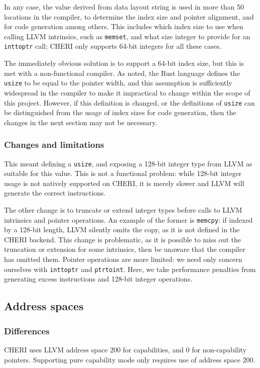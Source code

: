 \documentclass[dissertation.tex]{subfiles}
\begin{document}
In any case, the value derived from data layout string is used in more
than 50 locations in the compiler, to determine the index size and
pointer alignment, and for code generation among others.
This includes which index size to use when calling LLVM intrinsics, such
as \texttt{memset}, and what size integer to provide for an
\texttt{inttoptr} call; CHERI only supports 64-bit integers for all
these cases.

The immediately obvious solution is to support a 64-bit index size, but
this is met with a non-functional compiler.
As  noted, the Rust language defines the
\texttt{usize} to be equal to the pointer width, and this assumption is
sufficiently widespread in the compiler to make it impractical to change
within the scope of this project.
However, if this definition is changed, or the definitions of
\texttt{usize} can be distinguished from the usage of index sizes for
code generation, then the changes in the next section may not be
necessary.


\subsubsection{Changes and limitations}
This meant defining a \texttt{usize}, and exposing a 128-bit integer
type from LLVM as suitable for this value.
This is not a functional problem: while 128-bit integer usage is not
natively supported on CHERI, it is merely slower and LLVM will generate
the correct instructions.

The other change is to truncate or extend integer types before calls to
LLVM intrinsics and pointer operations.
An example of the former is \texttt{memcpy}: if indexed by a 128-bit
length, LLVM silently omits the copy, as it is not defined in the
CHERI backend.
This change is problematic, as it is possible to miss out the truncation
or extension for some intrinsics, then be unaware that the compiler has
omitted them.
Pointer operations are more limited: we need only concern ourselves with
\texttt{inttoptr} and \texttt{ptrtoint}.
Here, we take performance penalties from generating excess instructions
and 128-bit integer operations.


\subsection{Address spaces}
\label{sec:impl-addrspace}

\subsubsection{Differences}
CHERI uses LLVM address space 200 for capabilities, and 0 for
non-capability pointers.
Supporting pure capability mode only requires use of address space 200.
\end{document}
